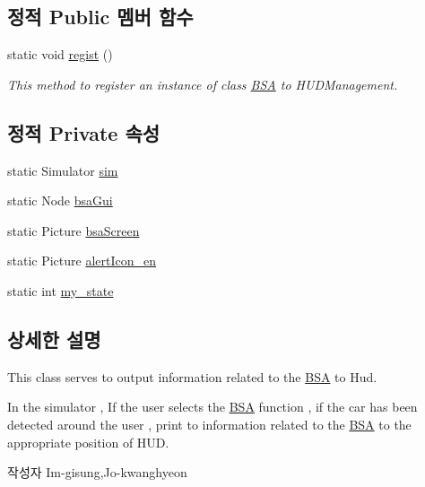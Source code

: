 \subsection*{정적 Public 멤버 함수}
\begin{DoxyCompactItemize}
\item 
static void \hyperlink{classkr_1_1ac_1_1kookmin_1_1cs_1_1_b_s_a_1_1_b_s_a_hud_a61e5431be2f589f6d4d32cf70efbe880}{regist} ()
\begin{DoxyCompactList}\small\item\em This method to register an instance of class \hyperlink{namespacekr_1_1ac_1_1kookmin_1_1cs_1_1_b_s_a}{B\+S\+A} to H\+U\+D\+Management. \end{DoxyCompactList}\end{DoxyCompactItemize}
\subsection*{정적 Private 속성}
\begin{DoxyCompactItemize}
\item 
static Simulator \hyperlink{classkr_1_1ac_1_1kookmin_1_1cs_1_1_b_s_a_1_1_b_s_a_hud_a94269498fba32b6567a641dc5fa3f3be}{sim}
\item 
static Node \hyperlink{classkr_1_1ac_1_1kookmin_1_1cs_1_1_b_s_a_1_1_b_s_a_hud_a2401197078adb71369a9bc30d66ee9f0}{bsa\+Gui}
\item 
static Picture \hyperlink{classkr_1_1ac_1_1kookmin_1_1cs_1_1_b_s_a_1_1_b_s_a_hud_a634791106770e96193088681b4a7cf06}{bsa\+Screen}
\item 
static Picture \hyperlink{classkr_1_1ac_1_1kookmin_1_1cs_1_1_b_s_a_1_1_b_s_a_hud_a4bacb44beb3117557129c5e340ead0c4}{alert\+Icon\+\_\+en}
\item 
static int \hyperlink{classkr_1_1ac_1_1kookmin_1_1cs_1_1_b_s_a_1_1_b_s_a_hud_a90a752df5176c831c74f36190f77c0a2}{my\+\_\+state}
\end{DoxyCompactItemize}


\subsection{상세한 설명}
This class serves to output information related to the \hyperlink{namespacekr_1_1ac_1_1kookmin_1_1cs_1_1_b_s_a}{B\+S\+A} to Hud. 

In the simulator , If the user selects the \hyperlink{namespacekr_1_1ac_1_1kookmin_1_1cs_1_1_b_s_a}{B\+S\+A} function , if the car has been detected around the user , print to information related to the \hyperlink{namespacekr_1_1ac_1_1kookmin_1_1cs_1_1_b_s_a}{B\+S\+A} to the appropriate position of H\+U\+D. \begin{DoxyAuthor}{작성자}
Im-\/gisung,Jo-\/kwanghyeon 
\end{DoxyAuthor}


